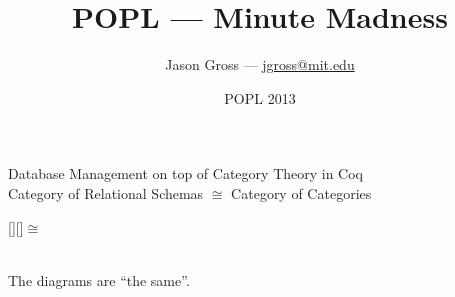 \documentclass[utf8x]{beamer}
\begin{document}
\title{POPL --- Minute Madness}
\date{POPL 2013}
\author{Jason Gross --- \href{mailto:jgross@mit.edu}{jgross@mit.edu}}

\begin{frame}{Database Management on top of Category Theory in Coq \\ Category of Relational Schemas $\cong$ Category of Categories}
  \begin{center}
     \raisebox{-3.5ex}[\height][\depth]{$\cong$}
 
    \vspace{4ex} \\ The diagrams are ``the same''.
  \end{center}
\end{frame}
\end{document}
